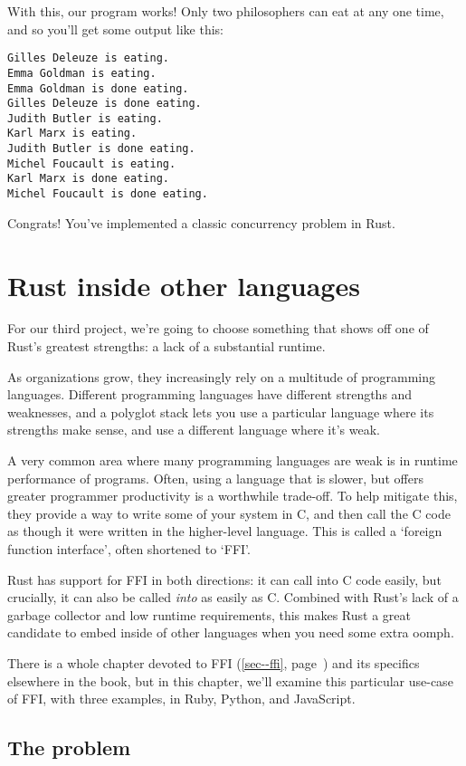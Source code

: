 \documentclass[a4paper,]{book}
\renewcommand*{\hyperref}[2][\ar]{%
  \def\ar{#2}%
  #2 (\autoref{#1}, page~\pageref{#1})}
\begin{document}
With this, our program works! Only two philosophers can eat at any one
time, and so you'll get some output like this:

\begin{verbatim}
Gilles Deleuze is eating.
Emma Goldman is eating.
Emma Goldman is done eating.
Gilles Deleuze is done eating.
Judith Butler is eating.
Karl Marx is eating.
Judith Butler is done eating.
Michel Foucault is eating.
Karl Marx is done eating.
Michel Foucault is done eating.
\end{verbatim}

Congrats! You've implemented a classic concurrency problem in Rust.

\section{Rust inside other
languages}\label{sec--rust-inside-other-languages}

For our third project, we're going to choose something that shows off
one of Rust's greatest strengths: a lack of a substantial runtime.

As organizations grow, they increasingly rely on a multitude of
programming languages. Different programming languages have different
strengths and weaknesses, and a polyglot stack lets you use a particular
language where its strengths make sense, and use a different language
where it's weak.

A very common area where many programming languages are weak is in
runtime performance of programs. Often, using a language that is slower,
but offers greater programmer productivity is a worthwhile trade-off. To
help mitigate this, they provide a way to write some of your system in
C, and then call the C code as though it were written in the
higher-level language. This is called a `foreign function interface',
often shortened to `FFI'.

Rust has support for FFI in both directions: it can call into C code
easily, but crucially, it can also be called \emph{into} as easily as C.
Combined with Rust's lack of a garbage collector and low runtime
requirements, this makes Rust a great candidate to embed inside of other
languages when you need some extra oomph.

There is a whole \hyperref[sec--ffi]{chapter devoted to FFI} and its
specifics elsewhere in the book, but in this chapter, we'll examine this
particular use-case of FFI, with three examples, in Ruby, Python, and
JavaScript.

\subsection{The problem}\label{the-problem}
\end{document}
